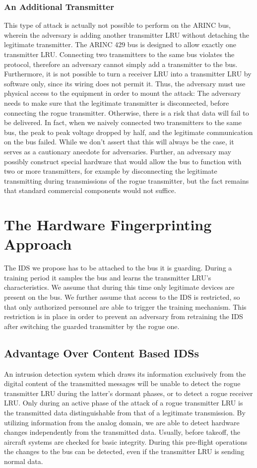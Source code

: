 \documentclass[conference]{IEEEtran}
\begin{document}
\subsubsection{An Additional Transmitter}
  This type of attack is actually not possible to perform on the ARINC bus, wherein the adversary is adding another transmitter LRU without detaching the legitimate transmitter. The ARINC 429 bus is designed to allow exactly one transmitter LRU. Connecting two transmitters to the same bus violates the protocol, therefore an adversary cannot simply add a transmitter to the bus. Furthermore, it is not possible to turn a receiver LRU into a transmitter LRU by software only, since its wiring does not permit it. Thus, the adversary must use physical access to the equipment in order to mount the attack: The adversary needs to make sure that the legitimate transmitter is disconnected, before connecting the rogue transmitter. Otherwise, there is a risk that data will fail to be delivered. In fact, when we naively connected two transmitters to the same bus, the peak to peak voltage dropped by half, and the legitimate communication on the bus failed. While we don't assert that this will always be the case, it serves as a cautionary anecdote for adversaries. Further, an adversary may possibly construct special hardware that would allow the bus to function with two or more transmitters, for example by disconnecting the legitimate transmitting during transmissions of the rogue transmitter, but the fact remains that standard commercial components would not suffice.

\section{The Hardware Fingerprinting Approach}
  The IDS we propose has to be attached to the bus it is guarding. During a training period it samples the bus and learns the transmitter LRU's characteristics. We assume that during this time only legitimate devices are present on the bus. We further assume that access to the IDS is restricted, so that only authorized personnel are able to trigger the training mechanism. This restriction is in place in order to prevent an adversary from retraining the IDS after switching the guarded transmitter by the rogue one.
  
\subsection{Advantage Over Content Based IDSs}
  An intrusion detection system which draws its information exclusively from the digital content of the transmitted messages will be unable to detect the rogue transmitter LRU during the latter's dormant phases, or to detect a rogue receiver LRU. Only during an active phase of the attack of a rogue transmitter LRU is the transmitted data distinguishable from that of a legitimate transmission. By utilizing information from the analog domain, we are able to detect hardware changes independently from the transmitted data.  Usually, before takeoff, the aircraft systems are checked for basic integrity. During this pre-flight operations the changes to the bus can be detected, even if the transmitter LRU is sending normal data.
  
\end{document}
